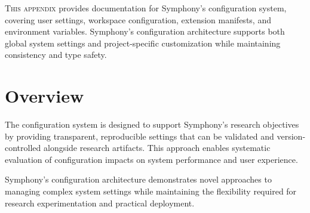 \label{app:configuration-reference}


\vspace{0.3cm}
\lettrine{T}{his appendix} provides documentation for Symphony's configuration system, covering user settings, workspace configuration, extension manifests, and environment variables. Symphony's configuration architecture supports both global system settings and project-specific customization while maintaining consistency and type safety.

\section*{Overview}

The configuration system is designed to support Symphony's research objectives by providing transparent, reproducible settings that can be validated and version-controlled alongside research artifacts. This approach enables systematic evaluation of configuration impacts on system performance and user experience.

Symphony's configuration architecture demonstrates novel approaches to managing complex system settings while maintaining the flexibility required for research experimentation and practical deployment.





